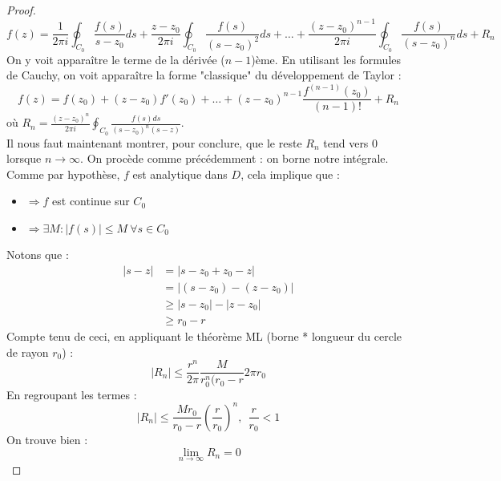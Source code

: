 \begin{proof}
	\begin{equation}
	f(z) = \frac{1}{2\pi i}\oint_{C_0}\frac{f(s)}{s-z_0}ds + \frac{z-z_0}{2\pi i}\oint_{C_0}
	\frac{f(s)}{(s-z_0)^2}ds + \dots + \frac{(z-z_0)^{n-1}}{2\pi i}\oint_{C_0}\frac{f(s)}{(s
	-z_0)^n}ds + R_n
	\end{equation}
	On y voit apparaître le terme de la dérivée ($n-1$)ème. En utilisant les formules de 
	Cauchy, on voit apparaître la forme "classique" du développement de Taylor :
	\begin{equation}
	f(z) = f(z_0) + (z-z_0)f'(z_0) + \dots + (z-z_0)^{n-1}\frac{f^{(n-1)}(z_0)}{(n-1)!}+R_n
	\end{equation}
	où $R_n = \frac{(z-z_0)^n}{2\pi i}\oint_{C_0}\frac{f(s)ds}{(s-z_0)^n(s-z)}$.\\
	
	Il nous faut maintenant montrer, pour conclure, que le reste $R_n$ tend vers 0 lorsque $n
	\rightarrow \infty$. On procède comme précédemment : on borne notre intégrale. Comme par
	hypothèse, $f$ est analytique dans $D$, cela implique que :
	\begin{itemize}
	\item $\Rightarrow f$ est continue sur $C_0$
	\item $\Rightarrow \exists M : |f(s)| \leq M\ \forall s \in C_0$
	\end{itemize}
	Notons que :
	\begin{equation}
	\begin{array}{ll}
	|s-z| &= |s-z_0+z_0-z|\\
	 &= |(s-z_0)-(z-z_0)|\\
	 &\geq |s-z_0|-|z-z_0|\\
	 &\geq r_0-r
	\end{array}
	\end{equation}
	Compte tenu de ceci, en appliquant le théorème ML (borne * longueur du cercle
	 de rayon $r_0$) :
	\begin{equation}
	|R_n| \leq \frac{r^n}{2\pi}\frac{M}{r^n_0(r_0-r}2\pi r_0
	\end{equation}
	En regroupant les termes :
	\begin{equation}
	|R_n| \leq \frac{Mr_0}{r_0-r}\left(\dfrac{r}{r_0}\right)^n, \ \ \frac{r}{r_0}<1
	\end{equation}
	On trouve bien :
	\begin{equation}
	\lim\limits_{n\rightarrow\infty} R_n = 0
	\end{equation}
	\end{proof}
	
